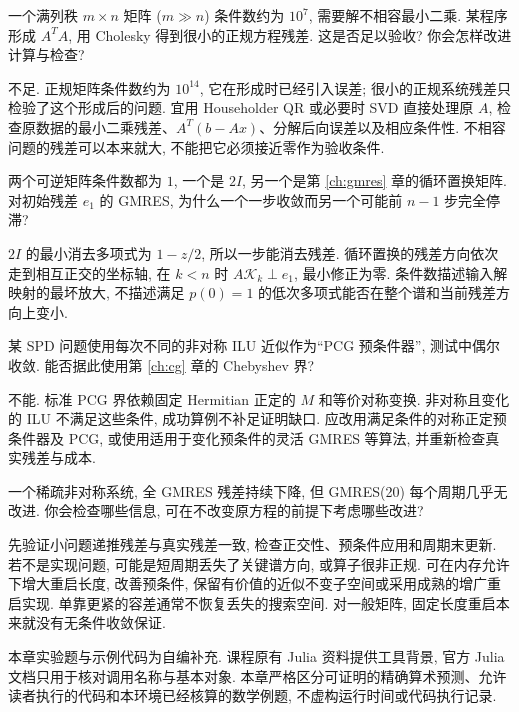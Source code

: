 \begin{exercise}
一个满列秩 $m\times n$ 矩阵 ($m\gg n$) 条件数约为 $10^7$, 需要解不相容最小二乘. 某程序形成 $A^TA$, 用 Cholesky 得到很小的正规方程残差. 这是否足以验收? 你会怎样改进计算与检查?
\end{exercise}
\begin{solution}
不足. 正规矩阵条件数约为 $10^{14}$, 它在形成时已经引入误差; 很小的正规系统残差只检验了这个形成后的问题. 宜用 Householder QR 或必要时 SVD 直接处理原 $A$, 检查原数据的最小二乘残差、$A^T(b-Ax)$、分解后向误差以及相应条件性. 不相容问题的残差可以本来就大, 不能把它必须接近零作为验收条件.
\end{solution}
\begin{exercise}
两个可逆矩阵条件数都为 $1$, 一个是 $2I$, 另一个是第 \ref{ch:gmres} 章的循环置换矩阵. 对初始残差 $e_1$ 的 GMRES, 为什么一个一步收敛而另一个可能前 $n-1$ 步完全停滞?
\end{exercise}
\begin{solution}
$2I$ 的最小消去多项式为 $1-z/2$, 所以一步能消去残差. 循环置换的残差方向依次走到相互正交的坐标轴, 在 $k<n$ 时 $A\mathcal K_k\perp e_1$, 最小修正为零. 条件数描述输入解映射的最坏放大, 不描述满足 $p(0)=1$ 的低次多项式能否在整个谱和当前残差方向上变小.
\end{solution}
\begin{exercise}
某 SPD 问题使用每次不同的非对称 ILU 近似作为“PCG 预条件器”, 测试中偶尔收敛. 能否据此使用第 \ref{ch:cg} 章的 Chebyshev 界?
\end{exercise}
\begin{solution}
不能. 标准 PCG 界依赖固定 Hermitian 正定的 $M$ 和等价对称变换. 非对称且变化的 ILU 不满足这些条件, 成功算例不补足证明缺口. 应改用满足条件的对称正定预条件器及 PCG, 或使用适用于变化预条件的灵活 GMRES 等算法, 并重新检查真实残差与成本.
\end{solution}
\begin{exercise}
一个稀疏非对称系统, 全 GMRES 残差持续下降, 但 GMRES(20) 每个周期几乎无改进. 你会检查哪些信息, 可在不改变原方程的前提下考虑哪些改进?
\end{exercise}
\begin{solution}
先验证小问题递推残差与真实残差一致, 检查正交性、预条件应用和周期末更新. 若不是实现问题, 可能是短周期丢失了关键谱方向, 或算子很非正规. 可在内存允许下增大重启长度, 改善预条件, 保留有价值的近似不变子空间或采用成熟的增广重启实现. 单靠更紧的容差通常不恢复丢失的搜索空间. 对一般矩阵, 固定长度重启本来就没有无条件收敛保证.
\end{solution}
\begin{remark}
本章实验题与示例代码为自编补充. 课程原有 Julia 资料提供工具背景, 官方 Julia 文档只用于核对调用名称与基本对象. 本章严格区分可证明的精确算术预测、允许读者执行的代码和本环境已经核算的数学例题, 不虚构运行时间或代码执行记录.
\end{remark}
